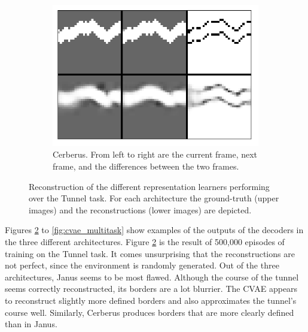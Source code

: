 \begin{figure}[t!]
	
	\begin{subfigure}{0.9\columnwidth}
		\centering
		\includegraphics[width=\linewidth]{img/cerberus_tunnel_recon.png}
		\caption{Cerberus. From left to right are the current frame, next frame, and the differences between the two frames.}
		\label{subfig:cerberus_reconstruction}
	\end{subfigure}

	\caption{Reconstruction of the different representation learners performing over the Tunnel task. For each architecture the ground-truth (upper images) and the reconstructions (lower images) are depicted.}
	\label{fig:repr_learner_reconstructions}
\end{figure}

Figures \ref{fig:repr_learner_reconstructions} to \ref{fig:cvae_multitask} show examples of the outputs of the decoders in the three different architectures. Figure \ref{fig:repr_learner_reconstructions} is the result of 500,000 episodes of training on the Tunnel task. It comes unsurprising that the reconstructions are not perfect, since the environment is randomly generated. Out of the three architectures, Janus seems to be most flawed. Although the course of the tunnel seems correctly reconstructed, its borders are a lot blurrier. The CVAE appears to reconstruct slightly more defined borders and also approximates the tunnel's course well. Similarly, Cerberus produces borders that are more clearly defined than in Janus.

